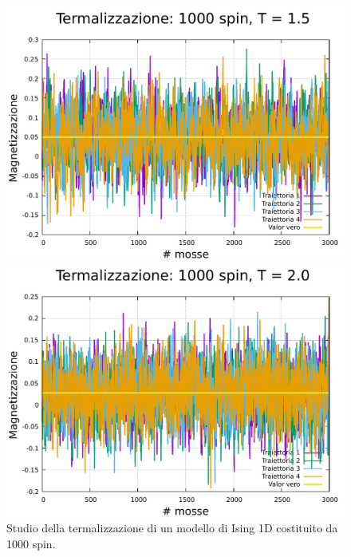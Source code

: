 \begin{figure}[htbp]
    \begin{minipage}{0.45\textwidth}  
      \centering
      \includegraphics[page=1, width=\textwidth]{Immagini/simIsing1D/term/term_1000_1.5.pdf}
      \caption{$T\,=\,1.5$}
    \end{minipage}\hfill
    \begin{minipage}{0.45\textwidth}  
      \centering
      \includegraphics[page=1, width=\textwidth]{Immagini/simIsing1D/term/term_1000_2.0.pdf}
      \caption{$T\,=\,2.0$}
    \end{minipage}
    \caption{Studio della termalizzazione di un modello di Ising 1D costituito da 1000 spin.}
\end{figure}

